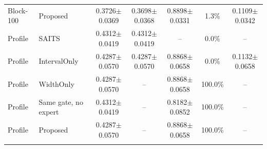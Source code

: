 \begin{table}
\begin{tabular*}{\textwidth}{@{\extracolsep{\fill}}llccccc@{}}
Block-100 & Proposed & 0.3726$\pm$0.0369 & 0.3698$\pm$0.0368 & 0.8898$\pm$0.0331 & 1.3\% & 0.1109$\pm$0.0342 \\
\addlinespace[1.5pt]
Profile & SAITS & 0.4312$\pm$0.0419 & 0.4312$\pm$0.0419 & -- & 0.0\% & -- \\
Profile & IntervalOnly & 0.4287$\pm$0.0570 & 0.4287$\pm$0.0570 & 0.8868$\pm$0.0658 & 0.0\% & 0.1132$\pm$0.0658 \\
Profile & WidthOnly & 0.4287$\pm$0.0570 & -- & 0.8868$\pm$0.0658 & 100.0\% & -- \\
Profile & Same gate, no expert & 0.4312$\pm$0.0419 & -- & 0.8182$\pm$0.0852 & 100.0\% & -- \\
Profile & Proposed & 0.4287$\pm$0.0570 & -- & 0.8868$\pm$0.0658 & 100.0\% & -- \\
\addlinespace[1.5pt]
\bottomrule
\end{tabular*}
\end{table}
\clearpage
